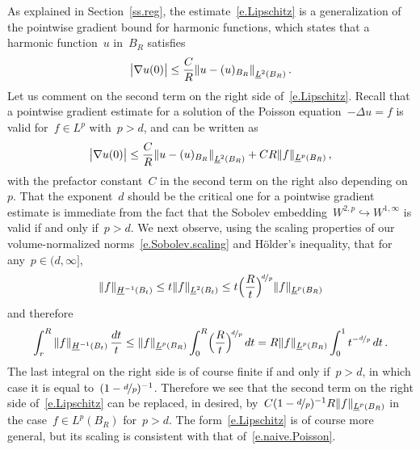 \documentclass[11pt,twoside]{article} %
\numberwithin{equation}{section}
\theoremstyle{definition}
\let\originalleft\left
\let\originalright\right
\renewcommand{\left}{\mathopen{}\mathclose\bgroup\originalleft}
\renewcommand{\right}{\aftergroup\egroup\originalright}
\begin{document}
As explained in Section~\ref{ss.reg}, the estimate~\eqref{e.Lipschitz} is a generalization of the pointwise gradient bound for harmonic functions, which states that a harmonic function~$u$ in~$B_R$ satisfies
\begin{equation*}
\bigl| \nabla u (0) \bigr| 
\leq 
\frac{C}{R} 
\left\| u - ( u )_{B_{R}} \right\|_{\underline{L}^2(B_{R})} 
\,.
\end{equation*}
Let us comment on the second term on the right side of~\eqref{e.Lipschitz}. 
Recall that a pointwise gradient estimate for a solution of the Poisson equation~$-\Delta u = f$ is valid for~$f\in L^p$ with~$p > d$, and can be written as
\begin{equation}
\label{e.naive.Poisson}
\bigl| \nabla u (0) \bigr| 
\leq 
\frac{C}{R} 
\left\| u - ( u )_{B_{R}} \right\|_{\underline{L}^2(B_{R})} 
+
C R \| f \|_{\underline{L}^p(B_R)} \,,
\end{equation}
with the prefactor constant~$C$ in the second term on the right also depending on~$p$. That the exponent~$d$ should be the critical one for a pointwise gradient estimate is immediate from the fact that the Sobolev embedding~$W^{2,p} \hookrightarrow
W^{1,\infty}$ is valid if and only if~$p>d$. We next observe, using the scaling properties of our volume-normalized norms~\eqref{e.Sobolev.scaling} and H\"older's inequality, that for any~$p\in (d,\infty]$, 
\begin{equation*}
\| f \|_{\underline{H}^{-1}(B_t)}
\leq
t \| f \|_{\underline{L}^{2}(B_t)}
\leq 
t \Bigl( \frac{R}{t} \Bigr)^{\!\nicefrac dp}
\| f \|_{\underline{L}^{p}(B_R)}
\end{equation*}
and therefore
\begin{equation*}
\int_{r}^R \| f \|_{\underline{H}^{-1}(B_t)} \, \frac{dt}{t}
\leq
\| f \|_{\underline{L}^{p}(B_R)} 
\int_{0}^R  \Bigl( \frac{R}{t} \Bigr)^{\!\nicefrac dp} \, dt
=
R \| f \|_{\underline{L}^{p}(B_R)} 
\int_{0}^1 t^{-\nicefrac dp} \, dt
\,.
\end{equation*}
The last integral on the right side is of course finite if and only if~$p>d$, in which case it is equal to~$(1-\nicefrac dp)^{-1}$. Therefore we see that the second term on the right side of~\eqref{e.Lipschitz} can be replaced, in desired, by~$C(1-\nicefrac dp)^{-1} R \| f \|_{\underline{L}^{p}(B_R)}$ in the case~$f\in L^p(B_R)$ for~$p>d$. The form~\eqref{e.Lipschitz} is of course more general, but its scaling is consistent with that of~\eqref{e.naive.Poisson}. 


\smallskip
\end{document}
